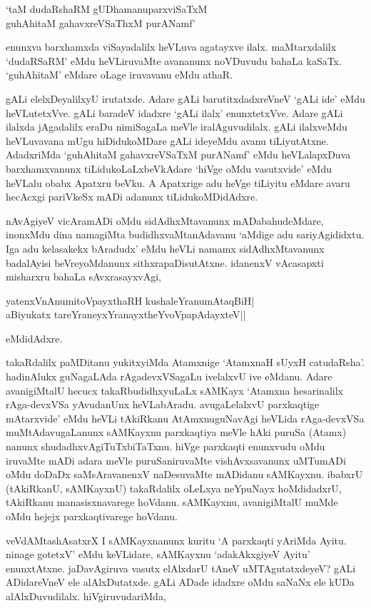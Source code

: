 \begin{shloka}
`taM dudaRshaRM gUDhamanuparxviSaTxM\\
guhAhitaM gahavxreVSaThxM purANamf'
\end{shloka}

enunxva barxhamxda viSayadalilx heVLuva agatayxve ilalx. maMtarxdalilx `dudaRSaRM' eMdu heVLiruvaMte avananunx noVDuvudu bahaLa kaSaTx. `guhAhitaM' eMdare oLage iruvavanu eMdu athaR.

gALi elelxDeyalilxyU irutatxde. Adare gALi barutitxdadxreVneV `gALi ide' eMdu heVLutetxVve. gALi baradeV idadxre `gALi ilalx' enunxtetxVve. Adare gALi ilalxda jAgadalilx eraDu nimiSagaLa meVle iralAguvudilalx. gALi ilalxveMdu heVLuvavana mUgu hiDidukoMDare gALi ideyeMdu avanu tiLiyutAtxne. AdadxriMda `guhAhitaM gahavxreVSaTxM purANamf' eMdu heVLalapxDuva barxhamxvanunx tiLidukoLaLxbeVkAdare `hiVge oMdu vasutxvide' eMdu heVLalu obabx Apatxru beVku. A Apatxrige adu heVge tiLiyitu eMdare avaru hecAcxgi pariVkeSx mADi adanunx tiLidukoMDidAdxre.

nAvAgiyeV vicAramADi oMdu sidAdhxMtavanunx mADabahudeMdare, inonxMdu dina namagiMta budidhxvaMtanAdavanu `aMdige adu sariyAgididxtu. Iga adu kelasakekx bAradudx' eMdu heVLi namamx sidAdhxMtavanunx badalAyisi beVreyoMdanunx sithxrapaDisutAtxne. idanenxV vAcasapxti misharxru bahaLa sAvxrasayxvAgi,

\begin{shloka}
yatenxVnAnumitoV\s payxthaRH kushaleYranumAtaqBiH|\\
aBiyukatx tareYraneyxYranayxtheYvoVpapAdayxteV||
\end{shloka}

\noindent eMdidAdxre.

takaRdalilx paMDitanu yukitxyiMda Atamxnige `AtamxnaH sUyxH catudaRsha'. hadinAlukx guNagaLAda rAgadevxVSagaLu ivelalxvU ive eMdanu. Adare avanigiMtalU hecucx takaRbudidhxyuLaLx sAMKayx `Atamxna hesarinalilx rAga-devxVSa yAvudanUnx heVLabAradu. avugaLelalxvU parxkaqtige mAtarxvide' eMdu heVLi tAkiRkanu AtAmxnuguNavAgi heVLida rAga-devxVSa muMtAdavugaLanunx sAMKayxnu parxkaqtiya meVle hAki puruSa (Atamx) nanunx shudadhxvAgiTuTxbiTaTxnu. hiVge parxkaqti enunxvudu oMdu iruvaMte mADi adara meVle puruSaniruvaMte vishAvxsavanunx uMTumADi oMdu doDaDx saMsAravanenxV naDesuvaMte mADidanu sAMKayxnu. ibabxrU (tAkiRkanU, sAMKayxnU) takaRdalilx oLeLxya neYpuNayx hoMdidadxrU, tAkiRkanu manasisxnavarege hoVdanu. sAMKayxnu, avanigiMtalU muMde oMdu hejejx parxkaqtivarege hoVdanu.

veVdAMtashAsatxrX I sAMKayxnanunx kuritu `A parxkaqti yAriMda Ayitu. ninage gotetxV' eMdu keVLidare, sAMKayxnu `adakAkxgiyeV Ayitu' enunxtAtxne. jaDavAgiruva vasutx elAlxdarU tAneV uMTAgutatxdeyeV? gALi ADidareVneV ele alAlxDutatxde. gALi ADade idadxre oMdu saNaNx ele kUDa alAlxDuvudilalx. hiVgiruvudariMda,

